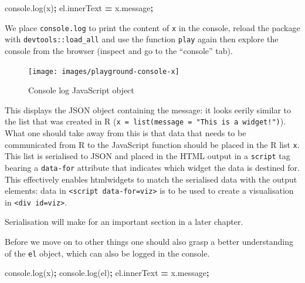 \documentclass[10pt,]{krantz}
\makeatletter
\newenvironment{Shaded}{\begin{snugshade}}{\end{snugshade}}
\newcommand{\AttributeTok}[1]{\textcolor[rgb]{0.61,0.61,0.61}{#1}}
\newcommand{\NormalTok}[1]{#1}
\newcommand{\OperatorTok}[1]{\textcolor[rgb]{0.43,0.43,0.43}{\textbf{#1}}}
\newcommand{\VariableTok}[1]{\textcolor[rgb]{0,0,0}{#1}}
\newenvironment{kframe}{%
\medskip{}
\setlength{\fboxsep}{.8em}
 \def\at@end@of@kframe{}%
 \ifinner\ifhmode%
  \def\at@end@of@kframe{\end{minipage}}%
  \begin{minipage}{\columnwidth}%
 \fi\fi%
 \def\FrameCommand##1{\hskip\@totalleftmargin \hskip-\fboxsep
 \colorbox{shadecolor}{##1}\hskip-\fboxsep
     \hskip-\linewidth \hskip-\@totalleftmargin \hskip\columnwidth}%
 \MakeFramed {\advance\hsize-\width
   \@totalleftmargin\z@ \linewidth\hsize
   \@setminipage}}%
 {\par\unskip\endMakeFramed%
 \at@end@of@kframe}
\renewenvironment{Shaded}{\begin{kframe}}{\end{kframe}}
\newenvironment{rmdblock}[1]
  {
  \begin{itemize}
  \renewcommand{\labelitemi}{
    \raisebox{-.7\height}[0pt][0pt]{
      {\setkeys{Gin}{width=3em,keepaspectratio}\texttt{[image: images/\#1]}}
    }
  }
  \setlength{\fboxsep}{1em}
  \begin{kframe}
  \item
  }
  {
  \end{kframe}
  \end{itemize}
  }
\newenvironment{rmdnote}
  {\begin{rmdblock}{note}}
  {\end{rmdblock}}
\makeatother
\begin{document}
\begin{Shaded}
\begin{Highlighting}[]
\VariableTok{console}\NormalTok{.}\AttributeTok{log}\NormalTok{(x)}\OperatorTok{;}
\VariableTok{el}\NormalTok{.}\AttributeTok{innerText} \OperatorTok{=} \VariableTok{x}\NormalTok{.}\AttributeTok{message}\OperatorTok{;}
\end{Highlighting}
\end{Shaded}

We place \texttt{console.log} to print the content of \texttt{x} in the console, reload the package with \texttt{devtools::load\_all} and use the function \texttt{play} again then explore the console from the browser (inspect and go to the ``console'' tab).

\begin{figure}[H]

{\centering \texttt{[image: images/playground-console-x]} 

}

\caption{Console log JavaScript object}\label{fig:playground-console}
\end{figure}

This displays the JSON object containing the message: it looks eerily similar to the list that was created in R (\texttt{x\ =\ list(message\ =\ "This\ is\ a\ widget!")}). What one should take away from this is that data that needs to be communicated from R to the JavaScript function should be placed in the R list \texttt{x}. This list is serialised to JSON and placed in the HTML output in a \texttt{script} tag bearing a \texttt{data-for} attribute that indicates which widget the data is destined for. This effectively enables htmlwidgets to match the serialised data with the output elements: data in \texttt{\textless{}script\ data-for=\textquotesingle{}viz\textquotesingle{}\textgreater{}} is to be used to create a visualisation in \texttt{\textless{}div\ id=\textquotesingle{}viz\textquotesingle{}\textgreater{}}.

\begin{rmdnote}
Serialisation will make for an important section in a later chapter.
\end{rmdnote}

Before we move on to other things one should also grasp a better understanding of the \texttt{el} object, which can also be logged in the console.

\begin{Shaded}
\begin{Highlighting}[]
\VariableTok{console}\NormalTok{.}\AttributeTok{log}\NormalTok{(x)}\OperatorTok{;}
\VariableTok{console}\NormalTok{.}\AttributeTok{log}\NormalTok{(el)}\OperatorTok{;}
\VariableTok{el}\NormalTok{.}\AttributeTok{innerText} \OperatorTok{=} \VariableTok{x}\NormalTok{.}\AttributeTok{message}\OperatorTok{;}
\end{Highlighting}
\end{Shaded}
\end{document}
